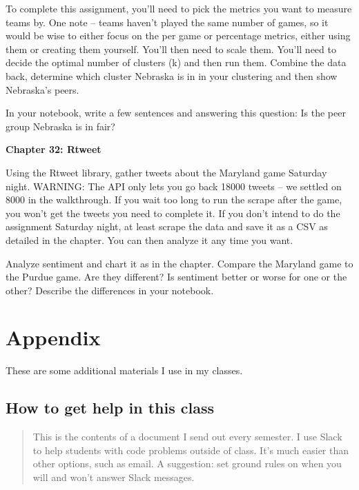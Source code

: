 \documentclass[]{book}
\begin{document}
To complete this assignment, you'll need to pick the metrics you want to measure teams by. One note -- teams haven't played the same number of games, so it would be wise to either focus on the per game or percentage metrics, either using them or creating them yourself. You'll then need to scale them. You'll need to decide the optimal number of clusters (k) and then run them. Combine the data back, determine which cluster Nebraska is in in your clustering and then show Nebraska's peers.

In your notebook, write a few sentences and answering this question: Is the peer group Nebraska is in fair?

\textbf{Chapter 32: Rtweet}

Using the Rtweet library, gather tweets about the Maryland game Saturday night. WARNING: The API only lets you go back 18000 tweets -- we settled on 8000 in the walkthrough. If you wait too long to run the scrape after the game, you won't get the tweets you need to complete it. If you don't intend to do the assignment Saturday night, at least scrape the data and save it as a CSV as detailed in the chapter. You can then analyze it any time you want.

Analyze sentiment and chart it as in the chapter. Compare the Maryland game to the Purdue game. Are they different? Is sentiment better or worse for one or the other? Describe the differences in your notebook.

\hypertarget{appendix}{%
\chapter{Appendix}\label{appendix}}

These are some additional materials I use in my classes.

\hypertarget{how-to-get-help-in-this-class}{%
\section{How to get help in this class}\label{how-to-get-help-in-this-class}}

\begin{quote}
This is the contents of a document I send out every semester. I use Slack to help students with code problems outside of class. It's much easier than other options, such as email. A suggestion: set ground rules on when you will and won't answer Slack messages.
\end{quote}
\end{document}
